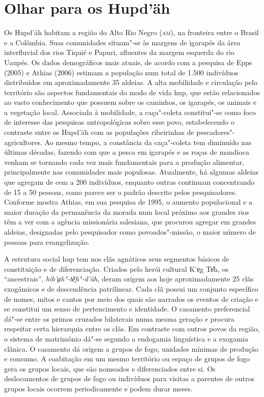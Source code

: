 \section{Olhar para os Hupd'äh}\label{olhares-para-os-hupduxe4h}

Os Hupd'äh habitam a região do Alto Rio Negro (\textsc{am}), na fronteira entre o
Brasil e a Colômbia. Suas comunidades situam"-se às margens de igarapés
da área interfluvial dos rios Tiquié e Papuri, afluentes da margem
esquerda do rio Uaupés. Os dados demográficos mais atuais, de acordo com
a pesquisa de Epps (2005) e Athias (2006) estimam a população num total
de 1.500 indivíduos distribuídos em aproximadamente 35 aldeias. A alta
mobilidade e circulação pelo território são aspectos fundamentais do
modo de vida hup, que estão relacionados ao vasto conhecimento que
possuem sobre os caminhos, os igarapés, os animais e a vegetação local.
Associada à mobilidade, a caça"-coleta constitui"-se como foco de
interesse das pesquisas antropológicas sobre esse povo, estabelecendo o
contraste entre os Hupd'äh com as populações ribeirinhas de
pescadores"-agricultores. Ao mesmo tempo, a constância da caça"-coleta tem
diminuído nas últimas décadas, fazendo com que a pesca em igarapés e as
roças de mandioca venham se tornando cada vez mais fundamentais para a
produção alimentar, principalmente nas comunidades mais populosas.
Atualmente, há algumas aldeias que agregam de cem a 200 indivíduos,
enquanto outras continuam concentrando de 15 a 50 pessoas, como parece
ser o padrão descrito pelos pesquisadores. Conforme mostra Athias, em
sua pesquisa de 1995, o aumento populacional e a maior duração da
permanência da morada num local próximo aos grandes rios têm a ver com a
agência missionária salesiana, que procurou agregar em grandes aldeias,
designadas pelo pesquisador como povoados"-missão, o maior número de
pessoas para evangelização.


A estrutura social hup tem nos clãs agnáticos seus segmentos básicos de
constituição e de diferenciação. Criados pelo herói cultural K'e̖g Te͂h,
os ``ancestrais'', \textit{hib'a̗h"-tẽ̖h"-d'äh}, deram origem aos hoje
aproximadamente 25 clãs exogâmicos e de descendência patrilinear. Cada
clã possui um conjunto específico de nomes, mitos e cantos por meio dos
quais são narrados os eventos de criação e se constitui um senso de
pertencimento e identidade. O casamento preferencial dá"-se entre os
primos cruzados bilaterais numa mesma geração e procura respeitar certa
hierarquia entre os clãs. Em contraste com outros povos da região, o
sistema de matrimônio dá"-se segundo a endogamia linguística e a exogamia
clânica. O casamento dá origem a grupos de fogo, unidades mínimas de
produção e consumo. A coabitação em um mesmo território ou espaço de
grupos de fogo gera os grupos locais, que são nomeados e diferenciados
entre si. Os deslocamentos de grupos de fogo ou indivíduos para visitas
a parentes de outros grupos locais ocorrem periodicamente e podem durar
meses.

